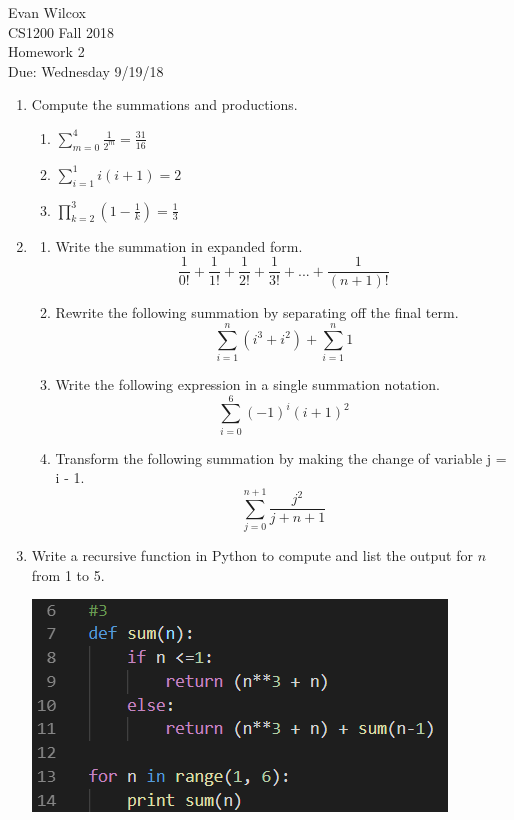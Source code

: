 \documentclass{article}
\begin{document}
\begin{flushleft}
Evan Wilcox
\\CS1200 Fall 2018
\\Homework 2
\\Due: Wednesday 9/19/18
\end{flushleft}

\begin{enumerate}
    \item Compute the summations and productions.
    \begin{enumerate}
        \item $\sum\limits_{m=0}^{4} \frac{1}{2^{m}} = \frac{31}{16}$

        \item $\sum\limits_{i=1}^{1} i(i+1) = 2$

        \item $\prod\limits_{k=2}^{3} (1-\frac{1}{k}) = \frac{1}{3}$
        
    \end{enumerate}
    
    \item
    \begin{enumerate}
        \item  Write the summation in expanded form.
        $$\frac{1}{0!} + \frac{1}{1!} + \frac{1}{2!} + \frac{1}{3!} + ... + \frac{1}{(n+1)!}$$

        \item  Rewrite the following summation by separating off the final term.
        $$\sum\limits_{i=1}^{n} (i^{3}+i^{2}) + \sum\limits_{i=1}^{n} 1$$

        \item  Write the following expression in a single summation notation.
        $$\sum\limits_{i=0}^{6} (-1)^{i}(i+1)^{2}$$

        \item Transform the following summation by making the change of variable j = i - 1.
        $$\sum\limits_{j=0}^{n+1} \frac{j^{2}}{j+n+1}$$
    \end{enumerate}

    \clearpage
    \item Write a recursive function in Python to compute and list the output for $n$ from 1 to 5.

    \includegraphics[scale=.8]{3a}


\end{enumerate}
\end{document}
